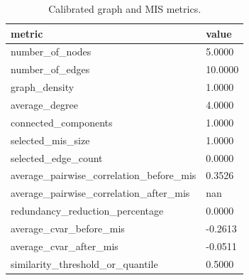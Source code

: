 \begin{table}[htbp]
\centering
\begin{tabular}{ll}
\hline
metric & value \\
\hline
number_of_nodes & 5.0000 \\
number_of_edges & 10.0000 \\
graph_density & 1.0000 \\
average_degree & 4.0000 \\
connected_components & 1.0000 \\
selected_mis_size & 1.0000 \\
selected_edge_count & 0.0000 \\
average_pairwise_correlation_before_mis & 0.3526 \\
average_pairwise_correlation_after_mis & nan \\
redundancy_reduction_percentage & 0.0000 \\
average_cvar_before_mis & -0.2613 \\
average_cvar_after_mis & -0.0511 \\
similarity_threshold_or_quantile & 0.5000 \\
\hline
\end{tabular}
\caption{Calibrated graph and MIS metrics.}
\label{table_graph_diversification}
\end{table}